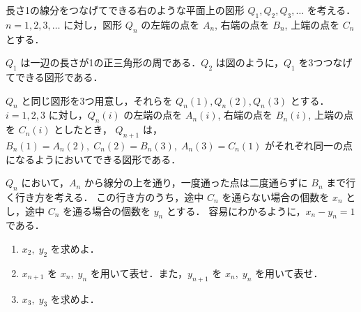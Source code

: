 \documentclass[unicode,12pt, A4j]{ltjsarticle}%
\begin{document}
長さ1の線分をつなげてできる右のような平面上の図形 $Q_1, Q_2, Q_3, \ldots$ を考える．\\
$n = 1, 2, 3, \ldots$ に対し，図形 $Q_n$ の左端の点を $A_n$, 右端の点を $B_n$, 上端の点を $C_n$ とする．

$Q_1$ は一辺の長さが1の正三角形の周である．$Q_2$ は図のように，$Q_1$ を3つつなげてできる図形である．

$Q_n$ と同じ図形を3つ用意し，それらを $Q_n(1), Q_n(2), Q_n(3)$ とする．
$i = 1, 2, 3$ に対し，$Q_n(i)$ の左端の点を $A_n(i)$, 右端の点を $B_n(i)$, 上端の点を $C_n(i)$ としたとき，
$Q_{n+1}$ は，$B_n(1) = A_n(2),\; C_n(2) = B_n(3),\; A_n(3) = C_n(1)$ がそれぞれ同一の点になるようにおいてできる図形である．

$Q_n$ において，$A_n$ から線分の上を通り，一度通った点は二度通らずに $B_n$ まで行く行き方を考える．
この行き方のうち，途中 $C_n$ を通らない場合の個数を $x_n$ とし，途中 $C_n$ を通る場合の個数を $y_n$ とする．
容易にわかるように，$x_n - y_n = 1$ である．

\begin{enumerate}
\item $x_2,\; y_2$ を求めよ．
\item $x_{n+1}$ を $x_n,\; y_n$ を用いて表せ．また，$y_{n+1}$ を $x_n,\; y_n$ を用いて表せ．
\item $x_3,\; y_3$ を求めよ．
\end{enumerate}
\end{document}
